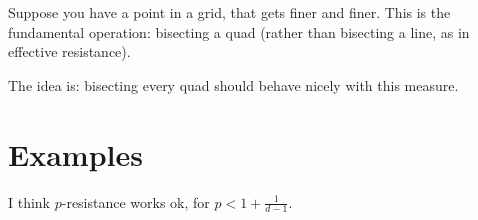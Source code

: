 Suppose you have a point in a grid, that gets finer and finer.
This is the fundamental operation: bisecting a quad (rather than
    bisecting a line, as in effective resistance).

The idea is: bisecting every quad should behave nicely with this
measure.

\section{Examples}
I think $p$-resistance works ok, for $p < 1 + \frac{1}{d-1}$.
